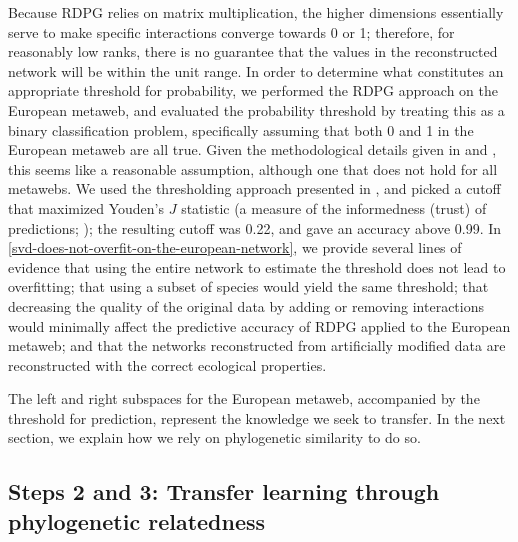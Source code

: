 \begin{refsection}
Because RDPG relies on matrix multiplication, the higher dimensions
essentially serve to make specific interactions converge towards 0 or 1;
therefore, for reasonably low ranks, there is no guarantee that the
values in the reconstructed network will be within the unit range. In
order to determine what constitutes an appropriate threshold for
probability, we performed the RDPG approach on the European metaweb, and
evaluated the probability threshold by treating this as a binary
classification problem, specifically assuming that both 0 and 1 in the
European metaweb are all true. Given the methodological details given in
\cite{Maiorano2020Tetraeu} and \cite{OConnor2020Unveiling}, this seems like a reasonable
assumption, although one that does not hold for all metawebs. We used
the thresholding approach presented in \cite{Poisot2021ImpMam}, and picked a
cutoff that maximized Youden's \(J\) statistic (a measure of the
informedness (trust) of predictions; \cite{Youden1950Index}); the resulting
cutoff was 0.22, and gave an accuracy above 0.99. In \autoref{svd-does-not-overfit-on-the-european-network}, we
provide several lines of evidence that using the entire network to
estimate the threshold does not lead to overfitting; that using a subset
of species would yield the same threshold; that decreasing the quality
of the original data by adding or removing interactions would minimally
affect the predictive accuracy of RDPG applied to the European metaweb;
and that the networks reconstructed from artificially modified data are
reconstructed with the correct ecological properties.

The left and right subspaces for the European metaweb, accompanied by
the threshold for prediction, represent the knowledge we seek to
transfer. In the next section, we explain how we rely on phylogenetic
similarity to do so.

\subsection{Steps 2 and 3: Transfer learning through phylogenetic
relatedness}\label{steps-2-and-3-transfer-learning-through-phylogenetic-relatedness}


\end{refsection}

